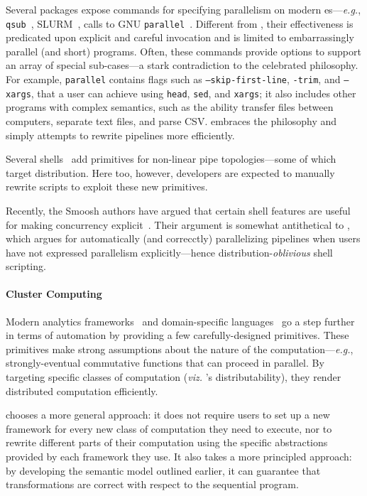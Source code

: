 \documentclass[acmsmall,10pt,review,anonymous]{acmart}
\newcommand{\eg}{{\em e.g.}, }
\newcommand{\ttt}[1]{\texttt{\small #1}}
\begin{document}
Several packages expose commands for specifying parallelism on modern \unix{}es---\eg \ttt{qsub}~\cite{gentzsch2001sun}, \textsc{SLURM}~\cite{yoo2003slurm}, calls to \textsc{GNU} \ttt{parallel}~\cite{Tange2011a}. %
Different from \sys, their effectiveness is predicated upon explicit and careful invocation and is limited to embarrassingly parallel (and short) programs.
Often, these commands provide options to support an array of special sub-cases---a stark contradiction to the celebrated \unix philosophy.
For example, \ttt{parallel} contains flags such as \ttt{--skip-first-line}, \ttt{-trim}, and \ttt{--xargs}, that a \unix user can achieve using \ttt{head}, \ttt{sed}, and \ttt{xargs}; it also includes other programs with complex semantics, such as the ability transfer files between computers, separate text files, and parse CSV.
\sys embraces the \unix philosophy and simply attempts to rewrite pipelines more efficiently.

Several shells~\cite{duff1990rc, mcdonald1988support, dagsh:17} add primitives for non-linear pipe topologies---some of which target distribution.
Here too, however, developers are expected to manually rewrite scripts to exploit these new primitives.

Recently, the Smoosh authors have argued that certain shell features are useful for making concurrency explicit~\cite{smoosh:18}.
Their argument is somewhat antithetical to \sys, %
  which argues for automatically (and correcctly) parallelizing pipelines when users have not expressed parallelism explicitly---hence distribution-\emph{oblivious} shell scripting.


\paragraph{Cluster Computing}
Modern analytics frameworks~\cite{mapreduce:08, ciel:11, spark:12, naiad:13} and domain-specific languages~\cite{alvaro2011consistency, distal:13, meiklejohn2015lasp} go a step further in terms of automation by providing a few carefully-designed primitives.
These primitives make strong assumptions about the nature of the computation---\eg strongly-eventual commutative functions that can proceed in parallel.
By targeting specific classes of computation (\emph{viz.} \sys's distributability), they render distributed computation efficiently.

\sys chooses a more general approach:
  it does not require users to set up a new framework for every new class of computation they need to execute, nor to rewrite different parts of their computation using the specific abstractions provided by each framework they use.
It also takes a more principled approach: by developing the semantic model outlined earlier, it can guarantee that transformations are correct with respect to the sequential program.
\end{document}
